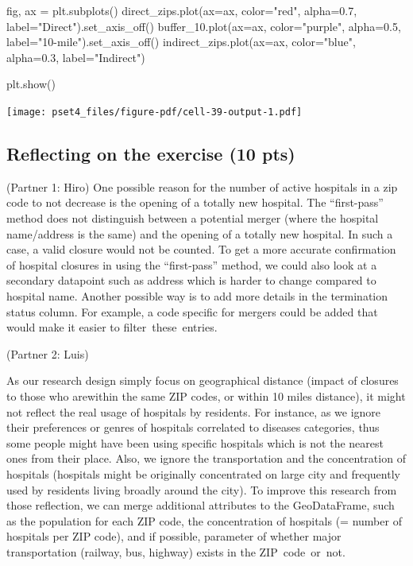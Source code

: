 \documentclass[
  letterpaper,
  DIV=11,
  numbers=noendperiod]{scrartcl}
\newenvironment{Shaded}{\begin{snugshade}}{\end{snugshade}}
\newcommand{\FloatTok}[1]{\textcolor[rgb]{0.68,0.00,0.00}{#1}}
\newcommand{\NormalTok}[1]{\textcolor[rgb]{0.00,0.23,0.31}{#1}}
\newcommand{\OperatorTok}[1]{\textcolor[rgb]{0.37,0.37,0.37}{#1}}
\newcommand{\StringTok}[1]{\textcolor[rgb]{0.13,0.47,0.30}{#1}}
\begin{document}
\begin{Shaded}
\begin{Highlighting}[]
\NormalTok{fig, ax }\OperatorTok{=}\NormalTok{ plt.subplots()}
\NormalTok{direct\_zips.plot(ax}\OperatorTok{=}\NormalTok{ax, color}\OperatorTok{=}\StringTok{"red"}\NormalTok{, alpha}\OperatorTok{=}\FloatTok{0.7}\NormalTok{, label}\OperatorTok{=}\StringTok{"Direct"}\NormalTok{).set\_axis\_off()}
\NormalTok{buffer\_10.plot(ax}\OperatorTok{=}\NormalTok{ax, color}\OperatorTok{=}\StringTok{"purple"}\NormalTok{, alpha}\OperatorTok{=}\FloatTok{0.5}\NormalTok{,}
\NormalTok{               label}\OperatorTok{=}\StringTok{"10{-}mile"}\NormalTok{).set\_axis\_off()}
\NormalTok{indirect\_zips.plot(ax}\OperatorTok{=}\NormalTok{ax, color}\OperatorTok{=}\StringTok{"blue"}\NormalTok{, alpha}\OperatorTok{=}\FloatTok{0.3}\NormalTok{, label}\OperatorTok{=}\StringTok{"Indirect"}\NormalTok{)}

\NormalTok{plt.show()}
\end{Highlighting}
\end{Shaded}

\texttt{[image: pset4\_files/figure-pdf/cell-39-output-1.pdf]}

\subsection{Reflecting on the exercise (10
pts)}\label{reflecting-on-the-exercise-10-pts}

(Partner 1: Hiro) One possible reason for the number of active hospitals
in a zip code to not decrease is the opening of a totally new hospital.
The ``first-pass'' method does not distinguish between a potential
merger (where the hospital name/address is the same) and the opening of
a totally new hospital. In such a case, a valid closure would not be
counted. To get a more accurate confirmation of hospital closures in
using the ``first-pass'' method, we could also look at a secondary
datapoint such as address which is harder to change compared to hospital
name. Another possible way is to add more details in the termination
status column. For example, a code specific for mergers could be added
that would make it easier to filter~these~entries.

(Partner 2: Luis)

As our research design simply focus on geographical distance (impact of
closures to those who arewithin the same ZIP codes, or within 10 miles
distance), it might not reflect the real usage of hospitals by
residents. For instance, as we ignore their preferences or genres of
hospitals correlated to diseases categories, thus some people might have
been using specific hospitals which is not the nearest ones from their
place. Also, we ignore the transportation and the concentration of
hospitals (hospitals might be originally concentrated on large city and
frequently used by residents living broadly around the city). To improve
this research from those reflection, we can merge additional attributes
to the GeoDataFrame, such as the population for each ZIP code, the
concentration of hospitals (= number of hospitals per ZIP code), and if
possible, parameter of whether major transportation (railway, bus,
highway) exists in the ZIP~code~or~not.
\end{document}
